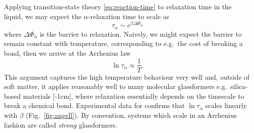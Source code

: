 \documentclass[11pt,twoside]{report}
\begin{document}
Applying transition-state theory \eqref{eq:reaction-time} to relaxation time in the liquid, we may expect the $\alpha$-relaxation time to scale as
\begin{equation}\label{eq:tau-barrier}
  \tau_\alpha \sim e^{\beta \Delta \Phi_\alpha}
\end{equation}
where $\Delta \Phi_\alpha$ is the barrier to relaxation.
Naively, we might expect the barrier to remain constant with temperature, corresponding to e.g.\ the cost of breaking a bond, then we arrive at the Arrhenius law
\begin{equation}\label{eq:arrhenius-law}
  \ln{\tau_\alpha} \propto \frac{1}{T}.
\end{equation}
This argument captures the high temperature behaviour very well and, outside of soft matter, it applies reasonably well to many molecular glassformers e.g.\ silica-based materials%
[-1cm],
where relaxation essentially depends on the timescale to break a chemical bond.
Experimental data for  \cite{AngellS1995} confirms that $\ln{\tau_\alpha}$ scales linearly with $\beta$ (Fig.\ \ref{fig:angell}).
By convention, systems which scale in an Arrhenius fashion are called \emph{strong}%
glassformers.
\end{document}
